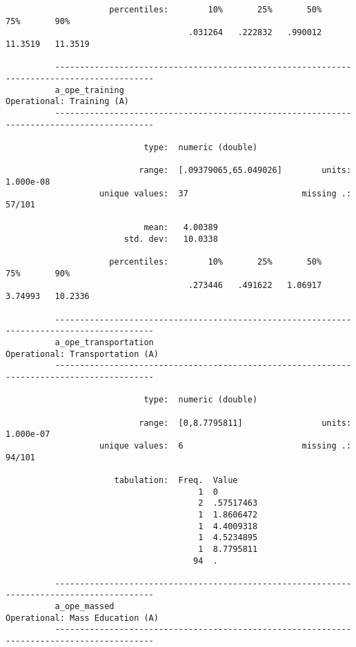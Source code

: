 \documentclass{article}
\begin{document}
\begin{verbatim}
                     percentiles:        10%       25%       50%       75%       90%
                                     .031264   .222832   .990012   11.3519   11.3519
          
          ------------------------------------------------------------------------------------------
          a_ope_training                                                   Operational: Training (A)
          ------------------------------------------------------------------------------------------
          
                            type:  numeric (double)
          
                           range:  [.09379065,65.049026]        units:  1.000e-08
                   unique values:  37                       missing .:  57/101
          
                            mean:   4.00389
                        std. dev:   10.0338
          
                     percentiles:        10%       25%       50%       75%       90%
                                     .273446   .491622   1.06917   3.74993   10.2336
          
          ------------------------------------------------------------------------------------------
          a_ope_transportation                                       Operational: Transportation (A)
          ------------------------------------------------------------------------------------------
          
                            type:  numeric (double)
          
                           range:  [0,8.7795811]                units:  1.000e-07
                   unique values:  6                        missing .:  94/101
          
                      tabulation:  Freq.  Value
                                       1  0
                                       2  .57517463
                                       1  1.8606472
                                       1  4.4009318
                                       1  4.5234895
                                       1  8.7795811
                                      94  .
          
          ------------------------------------------------------------------------------------------
          a_ope_massed                                               Operational: Mass Education (A)
          ------------------------------------------------------------------------------------------
          

\end{verbatim}
\end{document}
